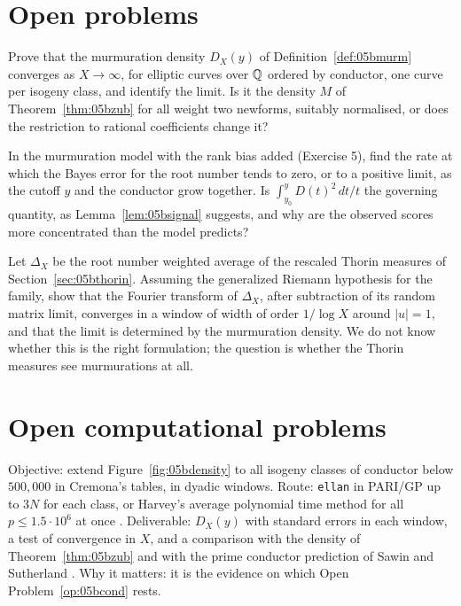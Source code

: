 \section{Open problems}

\begin{problem}\label{op:05bcond}
Prove that the murmuration density $D_X(y)$ of Definition~\ref{def:05bmurm} converges as $X\to\infty$, for elliptic curves over $\mathbb{Q}$ ordered by conductor, one curve per isogeny class, and identify the limit. Is it the density $M$ of Theorem~\ref{thm:05bzub} for all weight two newforms, suitably normalised, or does the restriction to rational coefficients change it?
\end{problem}

\begin{problem}\label{op:05bpost}
In the murmuration model with the rank bias added (Exercise 5), find the rate at which the Bayes error for the root number tends to zero, or to a positive limit, as the cutoff $y$ and the conductor grow together. Is $\int_{y_0}^y D(t)^2\,dt/t$ the governing quantity, as Lemma~\ref{lem:05bsignal} suggests, and why are the observed scores more concentrated than the model predicts?
\end{problem}

\begin{problem}\label{op:05bedge}
Let $\Delta_X$ be the root number weighted average of the rescaled Thorin measures of Section~\ref{sec:05bthorin}. Assuming the generalized Riemann hypothesis for the family, show that the Fourier transform of $\Delta_X$, after subtraction of its random matrix limit, converges in a window of width of order $1/\log X$ around $|u|=1$, and that the limit is determined by the murmuration density. We do not know whether this is the right formulation; the question is whether the Thorin measures see murmurations at all.
\end{problem}

\section{Open computational problems}

\begin{compproblem}\label{cp:05bscale}
Objective: extend Figure~\ref{fig:05bdensity} to all isogeny classes of conductor below $500{,}000$ in Cremona's tables, in dyadic windows. Route: \texttt{ellan} in PARI/GP up to $3N$ for each class, or Harvey's average polynomial time method for all $p\le1.5\cdot10^6$ at once \cite{harvey2014}. Deliverable: $D_X(y)$ with standard errors in each window, a test of convergence in $X$, and a comparison with the density of Theorem~\ref{thm:05bzub} and with the prime conductor prediction of Sawin and Sutherland \cite{sawinsutherland2025}. Why it matters: it is the evidence on which Open Problem~\ref{op:05bcond} rests.
\end{compproblem}

